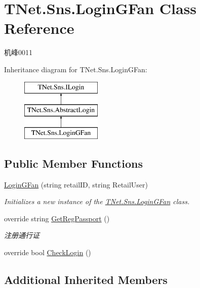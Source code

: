 \hypertarget{class_t_net_1_1_sns_1_1_login_g_fan}{}\section{T\+Net.\+Sns.\+Login\+G\+Fan Class Reference}
\label{class_t_net_1_1_sns_1_1_login_g_fan}


机峰0011  


Inheritance diagram for T\+Net.\+Sns.\+Login\+G\+Fan\+:\begin{figure}[H]
\begin{center}
\leavevmode
\includegraphics[height=3.000000cm]{class_t_net_1_1_sns_1_1_login_g_fan}
\end{center}
\end{figure}
\subsection*{Public Member Functions}
\begin{DoxyCompactItemize}
\item 
\mbox{\hyperlink{class_t_net_1_1_sns_1_1_login_g_fan_a82a0e153bfcb0505d69974e488fa2573}{Login\+G\+Fan}} (string retail\+ID, string Retail\+User)
\begin{DoxyCompactList}\small\item\em Initializes a new instance of the \mbox{\hyperlink{class_t_net_1_1_sns_1_1_login_g_fan}{T\+Net.\+Sns.\+Login\+G\+Fan}} class. \end{DoxyCompactList}\item 
override string \mbox{\hyperlink{class_t_net_1_1_sns_1_1_login_g_fan_aaa467dca1a6f8fc8eb55139f9bfad0ca}{Get\+Reg\+Passport}} ()
\begin{DoxyCompactList}\small\item\em 注册通行证 \end{DoxyCompactList}\item 
override bool \mbox{\hyperlink{class_t_net_1_1_sns_1_1_login_g_fan_abdd4ebf96e43f40d650e107f598109dc}{Check\+Login}} ()
\end{DoxyCompactItemize}
\subsection*{Additional Inherited Members}


